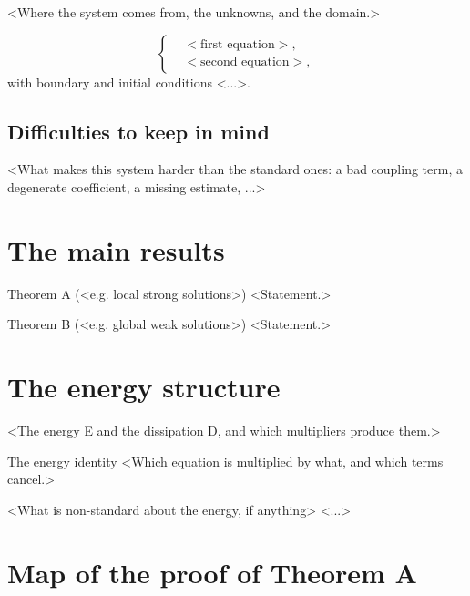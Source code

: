 <Where the system comes from, the unknowns, and the domain.>

\begin{equation}\label{eq:<short-name>-system}
  \left\{
  \begin{aligned}
    &<\text{first equation}>,\\
    &<\text{second equation}>,
  \end{aligned}
  \right.
\end{equation}
with boundary and initial conditions <...>.

\subsection*{Difficulties to keep in mind}

<What makes this system harder than the standard ones: a bad coupling term, a degenerate coefficient, a missing estimate, ...>

\section{The main results}

\begin{thmbox}{Theorem A (<e.g. local strong solutions>)}
<Statement.>
\end{thmbox}

\begin{thmbox}{Theorem B (<e.g. global weak solutions>)}
<Statement.>
\end{thmbox}

\section{The energy structure}

<The energy E and the dissipation D, and which multipliers produce them.>

\begin{step}{\routine{}The energy identity}
<Which equation is multiplied by what, and which terms cancel.>
\end{step}

\begin{stepnew}{\newidea{}<What is non-standard about the energy, if anything>}
<...>
\end{stepnew}

\section{Map of the proof of Theorem A}

